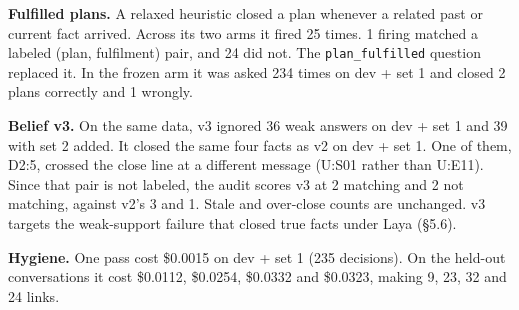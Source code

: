 \documentclass[11pt]{article}
\newcommand{\src}[1]{}
\begin{document}
\textbf{Fulfilled plans.} A relaxed heuristic closed a plan whenever a related past or current fact arrived. Across its two arms it fired 25\src{bench/results/e2_jev_v2__dev_updates.json + bench/results/e3_structural_v2__dev_updates.json (fulfills_log) vs bench/updates_conv26.json close_fulfilled pairs} times. 1\src{bench/results/e2_jev_v2__dev_updates.json + bench/results/e3_structural_v2__dev_updates.json (fulfills_log) vs bench/updates_conv26.json close_fulfilled pairs} firing matched a labeled (plan, fulfilment) pair, and 24\src{bench/results/e2_jev_v2__dev_updates.json + bench/results/e3_structural_v2__dev_updates.json (fulfills_log) vs bench/updates_conv26.json close_fulfilled pairs} did not. The \texttt{plan\_\allowbreak{}fulfilled} question replaced it. In the frozen arm it was asked 234\src{bench/results/e4_belief_v2__dev_updates__k3.json} times on dev + set 1 and closed 2\src{bench/results/e4_belief_v2__dev_updates__k3.json} plans correctly and 1\src{bench/results/e4_belief_v2__dev_updates__k3.json} wrongly.

\textbf{Belief v3.} On the same data, v3 ignored 36\src{bench/results/e4_belief_v3__dev_updates__k3__noanswer.json} weak answers on dev + set 1 and 39\src{bench/results/e4_belief_v3__dev_updates2__k3__noanswer.json} with set 2 added. It closed the same four facts as v2 on dev + set 1. One of them, D2:5, crossed the close line at a different message (U:S01 rather than U:E11). Since that pair is not labeled, the audit scores v3 at 2\src{bench/results/e4_belief_v3__dev_updates__k3__noanswer.json} matching and 2\src{bench/results/e4_belief_v3__dev_updates__k3__noanswer.json} not matching, against v2's 3\src{bench/results/e4_belief_v2__dev_updates__k3.json} and 1\src{bench/results/e4_belief_v2__dev_updates__k3.json}. Stale and over-close counts are unchanged. v3 targets the weak-support failure that closed true facts under Laya (\S{}5.6).

\textbf{Hygiene.} One pass cost \$0.0015\src{bench/results/e4_belief_v2__dev_updates__k3.json} on dev + set 1 (235\src{bench/results/e4_belief_v2__dev_updates__k3.json} decisions). On the held-out conversations it cost \$0.0112\src{bench/results/e4_belief_v2__heldout_conv-30__k3.json}, \$0.0254\src{bench/results/e4_belief_v2__heldout_conv-41__k3.json}, \$0.0332\src{bench/results/e4_belief_v2__heldout_conv-42__k3.json} and \$0.0323\src{bench/results/e4_belief_v2__heldout_conv-43__k3.json}, making 9\src{bench/results/e4_belief_v2__heldout_conv-30__k3.json}, 23\src{bench/results/e4_belief_v2__heldout_conv-41__k3.json}, 32\src{bench/results/e4_belief_v2__heldout_conv-42__k3.json} and 24\src{bench/results/e4_belief_v2__heldout_conv-43__k3.json} links.
\end{document}
